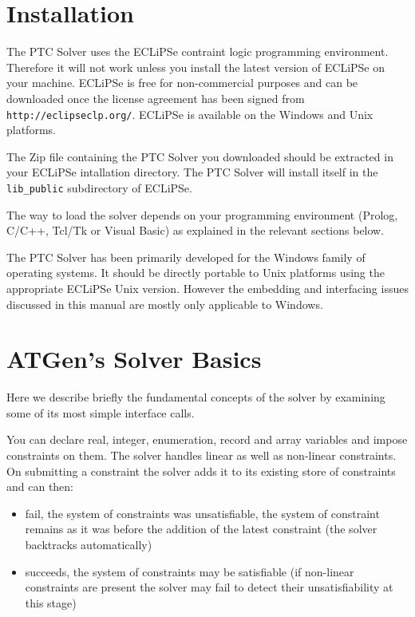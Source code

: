 \documentclass{article}
\begin{document}
\section{Installation}

The PTC Solver uses the ECLiPSe contraint logic programming environment.
Therefore
it will not work unless you install the latest version of ECLiPSe on your
machine. ECLiPSe is free for non-commercial purposes and can be downloaded once
the license agreement has been signed from
\texttt{http://eclipseclp.org/}.
ECLiPSe is available on the Windows and Unix platforms.

The Zip file containing the PTC Solver you downloaded should be extracted in your
ECLiPSe intallation directory. The
PTC Solver will install itself in the \texttt{lib\_public} subdirectory of
ECLiPSe.

The way to load the solver depends on your programming
environment (Prolog, C/C++, Tcl/Tk or Visual Basic) as explained in
the relevant sections below.

The PTC Solver has been primarily developed for the Windows family of operating
systems. It should be
directly portable to Unix platforms using the appropriate ECLiPSe Unix version.
However the embedding and interfacing issues discussed in this manual are mostly
only
applicable to Windows.

\section{ATGen's Solver Basics}

Here we describe briefly the fundamental concepts of the solver by examining
 some of its most simple interface calls.

You can declare real, integer, enumeration, record and array variables and impose
constraints on them.
The solver handles linear as well as non-linear constraints.
On submitting a constraint the solver adds it to its existing store of
constraints and can then:
\begin{itemize}
\item fail, the system of constraints was
unsatisfiable, the system of constraint remains as it was
before the addition of the latest constraint (the solver
backtracks automatically)
\item succeeds, the system of constraints may be satisfiable
(if non-linear constraints are present the solver may fail
to detect their unsatisfiability at this stage)
\end{itemize}
\end{document}
